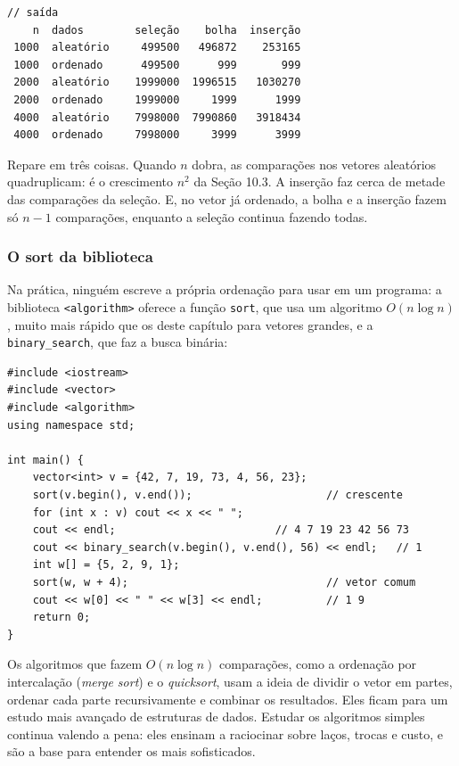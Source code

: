 \begin{codigo}
\begin{Verbatim}[breaklines=true, breaksymbolleft={}, fontsize=\footnotesize]
// saída
    n  dados        seleção    bolha  inserção
 1000  aleatório     499500   496872    253165
 1000  ordenado      499500      999       999
 2000  aleatório    1999000  1996515   1030270
 2000  ordenado     1999000     1999      1999
 4000  aleatório    7998000  7990860   3918434
 4000  ordenado     7998000     3999      3999
\end{Verbatim}
\end{codigo}

Repare em três coisas. Quando $n$ dobra, as comparações nos vetores aleatórios quadruplicam: é o crescimento $n^2$ da Seção 10.3. A inserção faz cerca de metade das comparações da seleção. E, no vetor já ordenado, a bolha e a inserção fazem só $n - 1$ comparações, enquanto a seleção continua fazendo todas.

\subsubsection{O sort da biblioteca}

Na prática, ninguém escreve a própria ordenação para usar em um programa: a biblioteca \texttt{<algorithm>} oferece a função \texttt{sort}, que usa um algoritmo $O(n \log n)$, muito mais rápido que os deste capítulo para vetores grandes, e a \texttt{binary\_search}, que faz a busca binária:

\begin{codigo}
\begin{Verbatim}[breaklines=true, breaksymbolleft={}, fontsize=\footnotesize]
#include <iostream>
#include <vector>
#include <algorithm>
using namespace std;

int main() {
    vector<int> v = {42, 7, 19, 73, 4, 56, 23};
    sort(v.begin(), v.end());                     // crescente
    for (int x : v) cout << x << " ";
    cout << endl;                         // 4 7 19 23 42 56 73
    cout << binary_search(v.begin(), v.end(), 56) << endl;   // 1
    int w[] = {5, 2, 9, 1};
    sort(w, w + 4);                               // vetor comum
    cout << w[0] << " " << w[3] << endl;          // 1 9
    return 0;
}
\end{Verbatim}
\end{codigo}

Os algoritmos que fazem $O(n \log n)$ comparações, como a ordenação por intercalação (\textit{merge sort}) e o \textit{quicksort}, usam a ideia de dividir o vetor em partes, ordenar cada parte recursivamente e combinar os resultados. Eles ficam para um estudo mais avançado de estruturas de dados. Estudar os algoritmos simples continua valendo a pena: eles ensinam a raciocinar sobre laços, trocas e custo, e são a base para entender os mais sofisticados.

